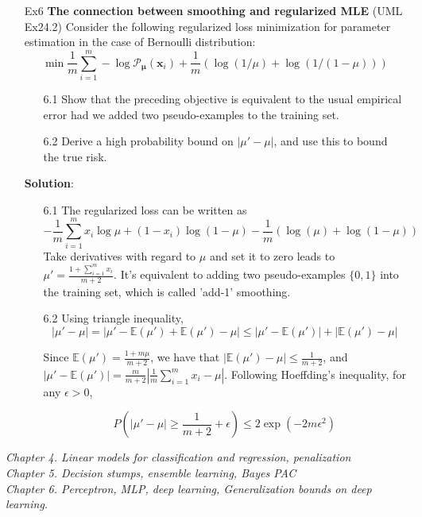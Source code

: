 \documentclass{article}
\begin{document}
\begin{itemize}
\item[Ex6] \textbf{The connection between smoothing and regularized MLE} (UML Ex24.2)  Consider the following regularized
loss minimization for parameter estimation in the case of Bernoulli distribution:
	\begin{equation*}
	\min \frac{1}{m}\sum_{i=1}^m -\log \mathcal{P}_{\bm{\mu}}(\bm{x}_i) + \frac{1}{m} (\log(1/\mu)+\log(1/(1-\mu)))
	\end{equation*}
	
	\begin{itemize}
	\item[6.1] Show that the preceding objective is equivalent to the usual empirical error had we added two pseudo-examples to the training set.
	\item[6.2] Derive a high probability bound on $|\mu'-\mu|$, and use this to bound the true risk.  
	\end{itemize}

\item[] \textbf{Solution}:
	\begin{itemize}
	\item[6.1] The regularized loss can be written as 
	\begin{equation*}
	-\frac{1}{m}\sum_{i=1}^m x_i\log \mu + (1-x_i)\log(1-\mu) - \frac{1}{m} (\log( \mu)+\log(1- \mu))
	\end{equation*}
Take derivatives with regard to $\mu$ and set it to zero leads to $\mu'=\frac{1+\sum_{i=1}^m x_i}{m+2}$. It's equivalent to adding two pseudo-examples $\{0,1\}$ into the training set, which is called 'add-1' smoothing.
	\item[6.2] Using triangle inequality,
	\begin{equation*}
	|\mu'-\mu| = |\mu'-\mathbb{E}(\mu')+\mathbb{E}(\mu')-\mu| \leq |\mu'-\mathbb{E}(\mu')| + |\mathbb{E}(\mu')-\mu|
	\end{equation*}

	Since $\mathbb{E}(\mu')=\frac{1+m\mu}{m+2}$, we have that $|\mathbb{E}(\mu')-\mu|\leq \frac{1}{m+2}$, and $|\mu'-\mathbb{E}(\mu')|=\frac{m}{m+2}|\frac{1}{m}\sum_{i=1}^m x_i -\mu|$. Following Hoeffding's inequality, for any $\epsilon>0$, 
	
	\begin{equation*}
	P\left(|\mu'-\mu|\geq \frac{1}{m+2} +\epsilon \right) \leq 2\exp\left( -2m\epsilon^2 \right)
	\end{equation*}
	
	\end{itemize}


\end{itemize}
\textit{
	Chapter 4. Linear models for classification and regression, penalization \\
	  Chapter 5. Decision stumps, ensemble learning, Bayes PAC \\
      Chapter 6. Perceptron, MLP, deep learning, Generalization bounds on deep learning.}
\end{document}
